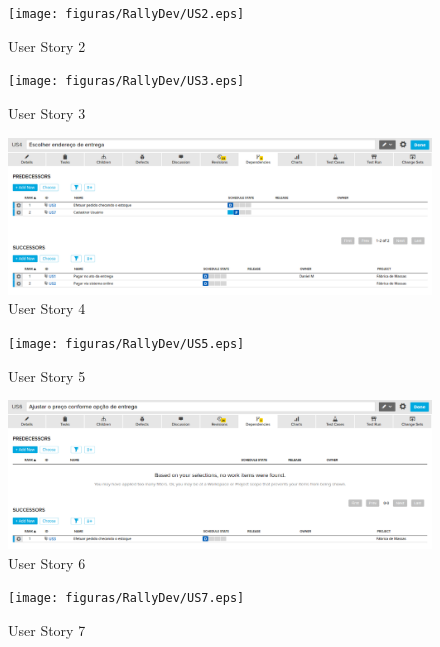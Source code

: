 \begin{figure}[h]
    \centering
    \label{fig01}
        \texttt{[image: figuras/RallyDev/US2.eps]}
    \caption{User Story 2}
\end{figure}

\begin{figure}[h]
    \centering
    \label{fig01}
        \texttt{[image: figuras/RallyDev/US3.eps]}
    \caption{User Story 3}
\end{figure}

\begin{figure}[h]
    \centering
    \label{fig01}
        \includegraphics[keepaspectratio=true,scale=0.3]{figuras/RallyDev/US4.eps}
    \caption{User Story 4}
\end{figure}

\begin{figure}[h]
    \centering
    \label{fig01}
        \texttt{[image: figuras/RallyDev/US5.eps]}
    \caption{User Story 5}
\end{figure}

\begin{figure}[h]
    \centering
    \label{fig01}
        \includegraphics[keepaspectratio=true,scale=0.3]{figuras/RallyDev/US6.eps}
    \caption{User Story 6}
\end{figure}

\begin{figure}[h]
    \centering
    \label{fig01}
        \texttt{[image: figuras/RallyDev/US7.eps]}
    \caption{User Story 7}
\end{figure}

